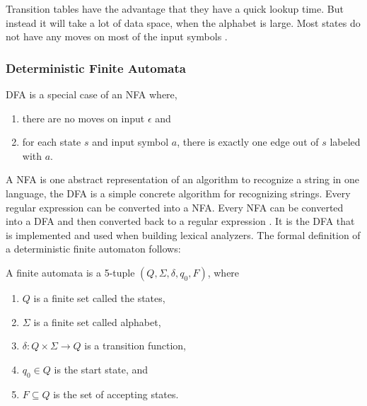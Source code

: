 Transition tables have the advantage that they have a quick lookup time. But 
instead it will take a lot of data space, when the alphabet is large. Most 
states do not have any moves on most of the input symbols \cite{Aho2006}.
\subsubsection{Deterministic Finite Automata}
DFA is a special case of an NFA where,
\begin{enumerate}
  \item there are no moves on input $\epsilon$ and
  \item for each state $s$ and input symbol $a$, there is exactly one edge out
        of $s$ labeled with $a$.
\end{enumerate}
A NFA is one abstract representation of an algorithm to recognize a string 
in one language, the DFA is a simple concrete algorithm for recognizing strings. 
Every regular expression can be converted into a NFA. Every NFA can be 
converted into a DFA and then converted back to a regular expression \cite{Aho2006}. 
It is the DFA that is implemented and used when building lexical analyzers.
The formal definition of a deterministic finite automaton follows:
\begin{definition} \label{finiteAutomataDef}
A finite automata is a 5-tuple $(Q, \Sigma, \delta, q_0, F)$, where
\begin{enumerate}
  \item $Q$ is a finite set called the states,
  \item $\Sigma$ is a finite set called alphabet,
  \item $\delta: Q \times \Sigma \to Q$ is a transition function,
  \item $q_0 \in Q$ is the start state, and
  \item $F \subseteq Q$ is the set of accepting states.
\end{enumerate} 
\end{definition}

